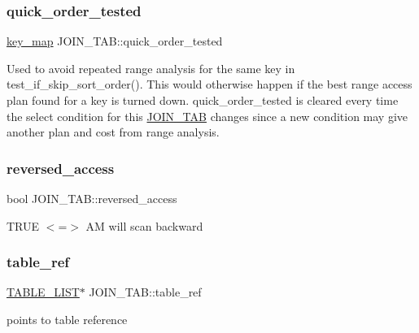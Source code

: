 \subsubsection{\texorpdfstring{quick\+\_\+order\+\_\+tested}{quick\_order\_tested}}
{\footnotesize\ttfamily \mbox{\hyperlink{classBitmap_3_0164_01_4}{key\+\_\+map}} J\+O\+I\+N\+\_\+\+T\+A\+B\+::quick\+\_\+order\+\_\+tested}

Used to avoid repeated range analysis for the same key in test\+\_\+if\+\_\+skip\+\_\+sort\+\_\+order(). This would otherwise happen if the best range access plan found for a key is turned down. quick\+\_\+order\+\_\+tested is cleared every time the select condition for this \mbox{\hyperlink{classJOIN__TAB}{J\+O\+I\+N\+\_\+\+T\+AB}} changes since a new condition may give another plan and cost from range analysis. \mbox{\label{classJOIN__TAB_a7a7e195850769137dccb04fa7b570e38}} 
\subsubsection{\texorpdfstring{reversed\+\_\+access}{reversed\_access}}
{\footnotesize\ttfamily bool J\+O\+I\+N\+\_\+\+T\+A\+B\+::reversed\+\_\+access}

T\+R\+UE $<$=$>$ AM will scan backward \mbox{\label{classJOIN__TAB_a3e8ef1b88000cc073fa054a86c603e26}} 
\subsubsection{\texorpdfstring{table\+\_\+ref}{table\_ref}}
{\footnotesize\ttfamily \mbox{\hyperlink{structTABLE__LIST}{T\+A\+B\+L\+E\+\_\+\+L\+I\+ST}}$\ast$ J\+O\+I\+N\+\_\+\+T\+A\+B\+::table\+\_\+ref}

points to table reference \mbox{\label{classJOIN__TAB_a9392ceffc2b5f5895015c55f66620172}} 
